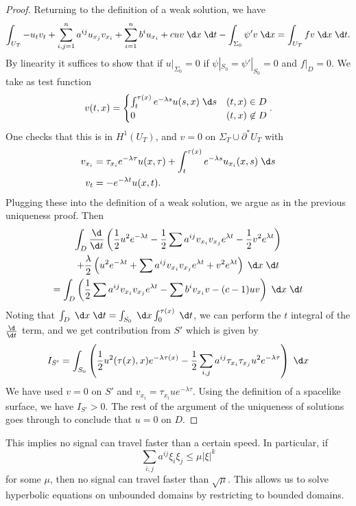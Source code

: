 \documentclass[a4paper]{article}
\begin{document}
\begin{proof}
  Returning to the definition of a weak solution, we have
  \[
    \int_{U_T} - u_t v_t + \sum_{i, j = 1}^{n} a^{ij} u_{x_j} v_{x_i} + \sum_{i = 1}^n b^i u_{x_i} + cuv \;\d x \;\d t - \int_{\Sigma_0} \psi' v \;\d x = \int_{U_T} fv \;\d x\;\d t.
  \]
  By linearity it suffices to show that if $u|_{\Sigma_0} = 0$ if $\psi|_{S_0} = \psi' |_{S_0} = 0$ and $f|_D = 0$. We take as test function
  \[
    v(t, x) =
    \begin{cases}
      \int_t^{\tau(x)} e^{-\lambda s} u(s, x)\;\d s & (t, x) \in D\\
      0 & (t, x) \not \in D
    \end{cases}.
  \]
  One checks that this is in $H^1(U_T)$, and $v = 0$ on $\Sigma_T \cup \partial^* U_T$ with
  \begin{align*}
    v_{x_i} &= \tau_{x_i} e^{-\lambda \tau} u(x, \tau) + \int_t^{\tau(x)} e^{-\lambda s} u_{x_i} (x, s) \;\d s\\
    v_t &= -e^{-\lambda t} u(x, t).
  \end{align*}
  Plugging these into the definition of a weak solution, we argue as in the previous uniqueness proof. Then
  \begin{multline*}
    \int_D \frac{\d}{\d t} \left(\frac{1}{2} u^2 e^{-\lambda t} - \frac{1}{2} \sum a^{ij} v_{x_i} v_{x_j} e^{\lambda t} - \frac{1}{2} v^2 e^{\lambda t}\right)\\
    + \frac{\lambda}{2} \left(u^2 e^{-\lambda t} + \sum a^{ij} v_{x_i} v_{x_j} e^{\lambda t}+ v^2 e^{\lambda t}\right)\;\d x\;\d t\\
    = \int_D \left(\frac{1}{2} \sum a^{ij} v_{x_i} v_{x_j} e^{\lambda t} - \sum b^i v_{x_i} v - (c - 1) uv\right)\;\d x\;\d t
  \end{multline*}
  Noting that $\int_D \;\d x \;\d t = \int_{S_0} \;\d x \int_0^{\tau(x)}\;\d t$, we can perform the $t$ integral of the $\frac{\d}{\d t}$ term, and we get contribution from $S'$ which is given by
  \[
    I_{S'} =\int_{S_0}\left(\frac{1}{2} u^2 (\tau(x), x) e^{-\lambda \tau(x)} - \frac{1}{2} \sum_{i, j} a^{ij} \tau_{x_i} \tau_{x_j} u^2 e^{-\lambda \tau}\right)\;\d x
  \]
  We have used $v = 0$ on $S'$ and $v_{x_i} = \tau_{x_i} u e^{-\lambda \tau}$. Using the definition of a spacelike surface, we have $I_{S'} > 0$. The rest of the argument of the uniqueness of solutions goes through to conclude that $u = 0$ on $D$.
\end{proof}
This implies no signal can travel faster than a certain speed. In particular, if
\[
  \sum_{i, j} a^{ij} \xi_i \xi_j \leq \mu |\xi|^k
\]
for some $\mu$, then no signal can travel faster than $\sqrt{\mu}$. This allows us to solve hyperbolic equations on unbounded domains by restricting to bounded domains.
\printindex
\end{document}
